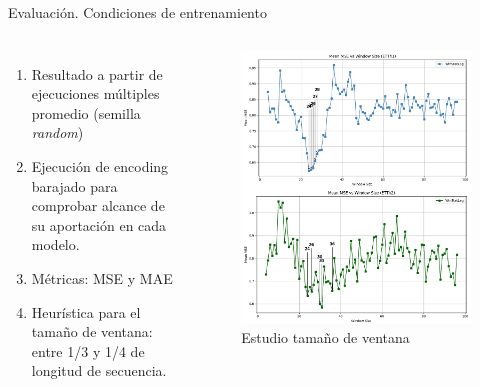 \documentclass[compress]{beamer}
\begin{document}
	\begin{frame}{Evaluación. Condiciones de entrenamiento}
		\begin{columns}
			\begin{enumerate}
				\item Resultado a partir de ejecuciones múltiples promedio (semilla \textit{random})
				\item Ejecución de encoding barajado para comprobar alcance de su aportación en cada modelo.
				\item Métricas: MSE y MAE
				\item Heurística para el tamaño de ventana: entre 1/3 y 1/4 de longitud de secuencia.
			\end{enumerate}
			
			\centering
			\begin{figure}
				\includegraphics[height=\columnwidth]{pic/wind.png}
				\caption{Estudio tamaño de ventana}
			\end{figure}
			
		\end{columns} 
		
		
	\end{frame}
	
\end{document}
